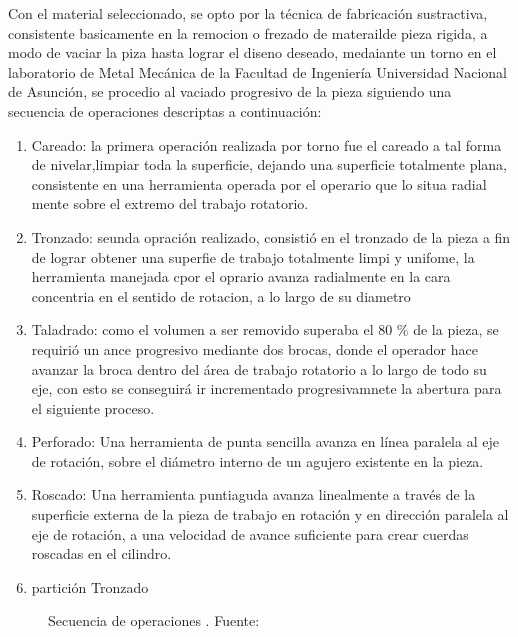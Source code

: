 Con el material seleccionado, se opto por la t\'ecnica de fabricación sustractiva, consistente basicamente en la remocion o frezado de materailde pieza rigida, a modo de vaciar la piza hasta lograr el diseno deseado, medaiante un torno en el laboratorio de Metal Mec\'anica de la Facultad de Ingenier\'ia Universidad Nacional de Asunci\'on, se procedio al vaciado progresivo de la pieza siguiendo una secuencia de operaciones descriptas a continuaci\'on:
\begin{enumerate}
    \item Careado: la primera operaci\'on realizada por torno fue el careado a tal forma de nivelar,limpiar toda la superficie, dejando una superficie totalmente plana, consistente en una herramienta operada por el operario que lo situa radial mente sobre el extremo del trabajo rotatorio.
    \item Tronzado: seunda opraci\'on realizado, consisti\'o en el tronzado de la pieza a fin de lograr obtener una superfie de trabajo totalmente limpi y unifome, la herramienta manejada cpor el oprario avanza radialmente en la cara concentria en el sentido de rotacion, a lo largo de su diametro 
    \item Taladrado: como el volumen  a ser removido superaba el 80 {\%} de la pieza, se requirió un ance progresivo mediante dos brocas, donde el operador hace avanzar la broca dentro del área de trabajo rotatorio a lo largo de todo su eje, con esto se conseguirá ir incrementado progresivamnete la abertura para el siguiente proceso.
    \item Perforado: Una herramienta de punta sencilla avanza en línea paralela al eje de rotación, sobre el diámetro interno de un agujero existente en la pieza.
    \item Roscado: Una herramienta puntiaguda avanza linealmente a través de la superficie externa de la pieza de trabajo en rotación y en dirección paralela al eje de rotación, a una velocidad de avance suficiente para crear cuerdas roscadas en el cilindro.
    \item partición Tronzado
\end{enumerate}
\begin{figure}[ht]
\centering
{}
\caption{Secuencia de operaciones . Fuente:\cite{groover_fundamentos_1997}}
\label{fig:torneado}
\end{figure}
